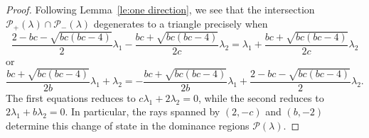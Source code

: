 \documentclass{amsart}
\numberwithin{theorem}{section}
\newcommand{\cP}{\mathcal{P}}
\begin{document}
  \begin{proof}
    Following Lemma~\ref{le:one direction}, we see that the intersection $\cP_+(\lambda)\cap\cP_-(\lambda)$ degenerates to a triangle precisely when
    \[\frac{2-bc-\sqrt{bc(bc-4)}}{2}\lambda_1-\frac{bc+\sqrt{bc(bc-4)}}{2c}\lambda_2=\lambda_1+\frac{bc+\sqrt{bc(bc-4)}}{2c}\lambda_2\]
    or 
    \[\frac{bc+\sqrt{bc(bc-4)}}{2b}\lambda_1+\lambda_2=-\frac{bc+\sqrt{bc(bc-4)}}{2b}\lambda_1+\frac{2-bc-\sqrt{bc(bc-4)}}{2}\lambda_2.\]
    The first equations reduces to $c\lambda_1+2\lambda_2=0$, while the second reduces to $2\lambda_1+b\lambda_2=0$.
    In particular, the rays spanned by $(2,-c)$ and $(b,-2)$ determine this change of state in the dominance regions $\cP(\lambda)$.
  \end{proof}

\end{document}
